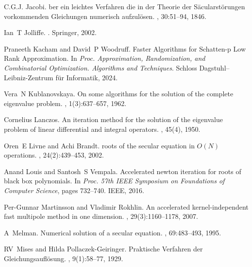 \documentclass{article}
\begin{document}
\begin{thebibliography}{10}
C.G.J. Jacobi.
ber ein leichtes {V}erfahren die in der {T}heorie der {S}\"acularstörungen vorkommenden {G}leichungen numerisch aufzul\"osen.
, 30:51--94, 1846.

Ian~T Jolliffe.
.
\newblock Springer, 2002.

Praneeth Kacham and David~P Woodruff.
\newblock Faster {Algorithms for Schatten-p Low Rank A}pproximation.
\newblock In {\em Proc. Approximation, Randomization, and Combinatorial Optimization. Algorithms and Techniques}. Schloss Dagstuhl--Leibniz-Zentrum f{\"u}r Informatik, 2024.

Vera~N Kublanovskaya.
\newblock On some algorithms for the solution of the complete eigenvalue problem.
, 1(3):637--657, 1962.

Cornelius Lanczos.
\newblock An iteration method for the solution of the eigenvalue problem of linear differential and integral operators.
, 45(4), 1950.

Oren~E Livne and Achi Brandt.
 roots of the secular equation in {$O(N)$} operations.
, 24(2):439--453, 2002.

Anand Louis and Santosh~S Vempala.
\newblock Accelerated newton iteration for roots of black box polynomials.
\newblock In {\em Proc. 57th IEEE Symposium on Foundations of Computer Science}, pages 732--740. IEEE, 2016.

Per-Gunnar Martinsson and Vladimir Rokhlin.
\newblock An accelerated kernel-independent fast multipole method in one dimension.
, 29(3):1160--1178, 2007.

A~Melman.
\newblock Numerical solution of a secular equation.
, 69:483--493, 1995.

RV~Mises and Hilda Pollaczek-Geiringer.
\newblock Praktische {Verfahren der Gleichungsaufl{\"o}s}ung.
, 9(1):58--77, 1929.


\end{thebibliography}
\end{document}
